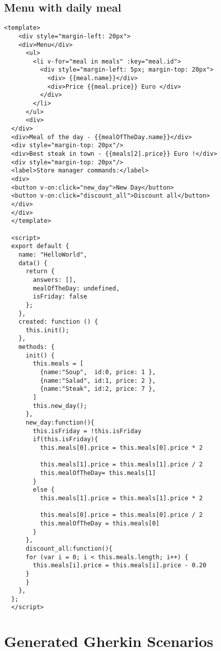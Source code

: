 \subsection{Menu with daily meal}
\label{appendix:daily_menu_source_code}
\begin{lstlisting}
<template>
    <div style="margin-left: 20px">
    <div>Menu</div>
      <ul>
        <li v-for="meal in meals" :key="meal.id">
          <div style="margin-left: 5px; margin-top: 20px">
            <div> {{meal.name}}</div> 
            <div>Price {{meal.price}} Euro </div>
          </div>
        </li>
      </ul>
      <div>
  </div>
  <div>Meal of the day - {{mealOfTheDay.name}}</div>
  <div style="margin-top: 20px"/>
  <div>Best steak in town - {{meals[2].price}} Euro !</div>
  <div style="margin-top: 20px"/>
  <label>Store manager commands:</label>
  <div>
  <button v-on:click="new_day">New Day</button>
  <button v-on:click="discount_all">Discount all</button>
  </div>
  </div>
  </template>
  
  <script>
  export default {
    name: "HelloWorld",
    data() {
      return {
        answers: [],
        mealOfTheDay: undefined,
        isFriday: false
      };
    },
    created: function () {
      this.init();
    },
    methods: {
      init() {
        this.meals = [
          {name:"Soup",  id:0, price: 1 },
          {name:"Salad", id:1, price: 2 },
          {name:"Steak", id:2, price: 7 },
        ]
        this.new_day();
      },
      new_day:function(){
        this.isFriday = !this.isFriday
        if(this.isFriday){
          this.meals[0].price = this.meals[0].price * 2
  
          this.meals[1].price = this.meals[1].price / 2
          this.mealOfTheDay= this.meals[1]
        }
        else {
          this.meals[1].price = this.meals[1].price * 2
  
          this.meals[0].price = this.meals[0].price / 2
          this.mealOfTheDay = this.meals[0]
        }
      },
      discount_all:function(){
      for (var i = 0; i < this.meals.length; i++) {
        this.meals[i].price = this.meals[i].price - 0.20 
      } 
      }
    },
  };
  </script>
\end{lstlisting}

\section{Generated Gherkin Scenarios}
